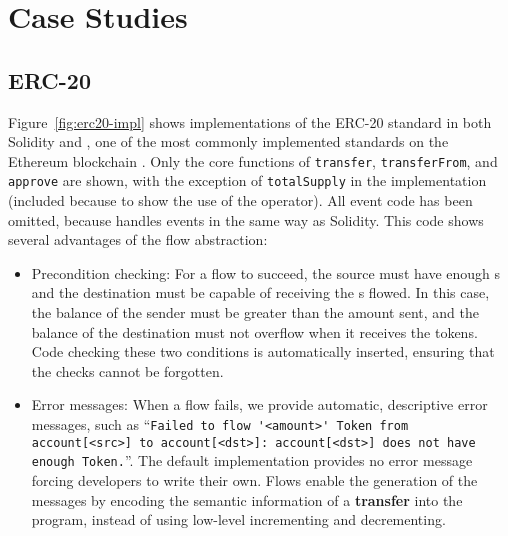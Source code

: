 \documentclass[sigconf]{acmart}
\begin{document}
\section{Case Studies}
\subsection{ERC-20}

Figure~\ref{fig:erc20-impl} shows implementations of the ERC-20  standard in both Solidity and \langName, one of the most commonly implemented standards on the Ethereum blockchain .
Only the core functions of \lstinline{transfer}, \lstinline{transferFrom}, and \lstinline{approve} are shown, with the exception of \lstinline{totalSupply} in the \langName implementation (included because to show the use of the \total operator).
All event code has been omitted, because \langName handles events in the same way as Solidity.
This code shows several advantages of the flow abstraction:
\begin{itemize}
    \item Precondition checking: For a flow to succeed, the source must have enough \assetTxt{}s and the destination must be capable of receiving the \assetTxt{}s flowed.
        In this case, the balance of the sender must be greater than the amount sent, and the balance of the destination must not overflow when it receives the tokens.
        Code checking these two conditions is automatically inserted, ensuring that the checks cannot be forgotten.
    \item Error messages: When a flow fails, we provide  automatic, descriptive error messages, such as ``\lstinline{Failed to flow '<amount>' Token from account[<src>] to account[<dst>]: account[<dst>] does not have enough Token.}''.
        The default implementation provides no error message forcing developers to write their own.
        Flows enable the generation of the messages by encoding the semantic information of a \textbf{transfer} into the program, instead of using low-level incrementing and decrementing.
\end{itemize}

\begin{figure*}[h]
    \centering
    \begin{minipage}[t]{0.5\textwidth}
        
    \end{minipage}%
    \begin{minipage}[t]{0.5\textwidth}
        
    \end{minipage}
    \caption{A Solidity and a \langName implementation of the core functions of the ERC-20 standard.}
    \label{fig:erc20-impl}
\end{figure*}
\end{document}
